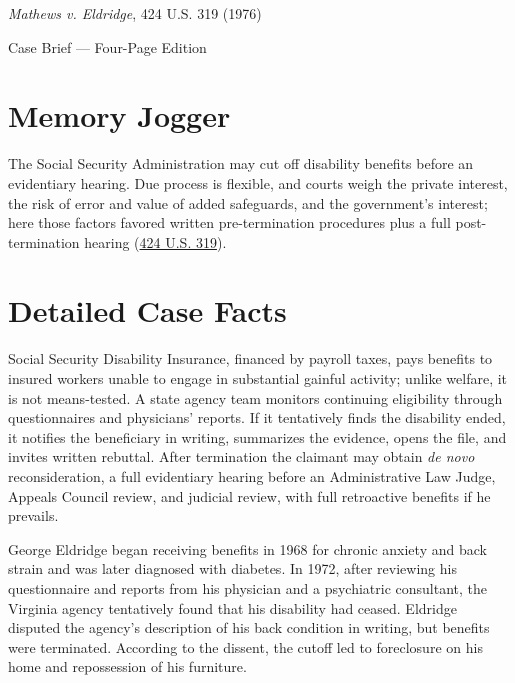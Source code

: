 \documentclass[12pt]{article}
\begin{document}
\begin{center}
{\LARGE \textit{Mathews v. Eldridge}, 424 U.S. 319 (1976)\par}
\vspace{0.8em}
{\large Case Brief --- Four-Page Edition\par}
\end{center}
\vspace{1em}

\section{Memory Jogger}

The Social Security Administration may cut off disability benefits before an evidentiary hearing. Due process is flexible, and courts weigh the private interest, the risk of error and value of added safeguards, and the government's interest; here those factors favored written pre-termination procedures plus a full post-termination hearing (\href{https://supreme.justia.com/cases/federal/us/424/319/}{424 U.S. 319}).

\section{Detailed Case Facts}

Social Security Disability Insurance, financed by payroll taxes, pays benefits to insured workers unable to engage in substantial gainful activity; unlike welfare, it is not means-tested. A state agency team monitors continuing eligibility through questionnaires and physicians' reports. If it tentatively finds the disability ended, it notifies the beneficiary in writing, summarizes the evidence, opens the file, and invites written rebuttal. After termination the claimant may obtain \textit{de novo} reconsideration, a full evidentiary hearing before an Administrative Law Judge, Appeals Council review, and judicial review, with full retroactive benefits if he prevails.

George Eldridge began receiving benefits in 1968 for chronic anxiety and back strain and was later diagnosed with diabetes. In 1972, after reviewing his questionnaire and reports from his physician and a psychiatric consultant, the Virginia agency tentatively found that his disability had ceased. Eldridge disputed the agency's description of his back condition in writing, but benefits were terminated. According to the dissent, the cutoff led to foreclosure on his home and repossession of his furniture.
\end{document}

